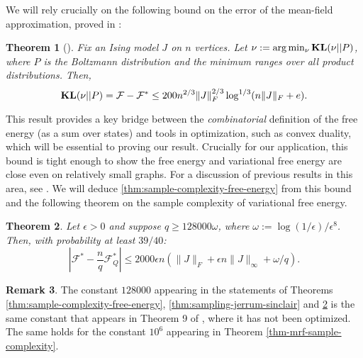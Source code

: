 \documentclass[final, 12pt]{colt2018}
\newcommand{\F}{\mathcal{F}}
\newcommand{\KL}{\mathop{\bf KL\/}}
\newcommand{\vnote}[1]{\textcolor{red}{\small {\textbf{(Vishesh: }#1\textbf{) }}}}
\newtheorem{theorem}{Theorem}[section]
\theoremstyle{definition}
\newtheorem{remark}[theorem]{Remark}
\theoremstyle{plain}
\begin{document}
We will rely crucially on the following bound on the error
of the mean-field approximation, proved in \citep{previous-paper}:
\begin{theorem}[\citet{previous-paper}]\label{thm-main-structural-result} 
Fix an Ising model $J$ on $n$ vertices.
Let $\nu := \arg\min_{\nu} \KL(\nu || P)$, where $P$ is the Boltzmann distribution and the minimum ranges
over all product distributions. %
Then,
$$ \KL(\nu || P)  = \F - \F^{*} \leq 200 n^{2/3} \|J\|_F^{2/3} \log^{1/3}(n \|J\|_F + e).$$
\end{theorem}
This result provides a key bridge between
the \emph{combinatorial} definition of the free energy
(as a sum over states) and tools in optimization, such
as convex duality, which will be essential to proving our result.
Crucially for our application, this bound is tight enough to show the free energy and variational free energy are close even on relatively small graphs. For a discussion of previous
results in this area, see \citep{previous-paper}. We will deduce \cref{thm:sample-complexity-free-energy} from this bound and the following theorem on the sample complexity of variational free energy. 

\begin{theorem}
\label{thm:sample-complexity-variational-free-energy}
Let $\epsilon > 0$ and suppose $q \ge 128000\omega$, where $\omega:=\log(1/\epsilon)/\epsilon^{8}$. 
Then, with probability at least $39/40$:
$$\left|\F^* - \frac{n}{q}\F^*_Q\right| \leq 2000\epsilon n \left(\|J\|_F + \epsilon n \|J\|_{\infty} + \omega/q \right).$$
\end{theorem}

\begin{remark}The constant $128000$ appearing in the statements of Theorems \ref{thm:sample-complexity-free-energy}, \ref{thm:sampling-jerrum-sinclair} and \ref{thm:sample-complexity-variational-free-energy} is the same constant that appears in Theorem 9 of \citep{alon-etal-samplingCSP-conference}, where it has not been optimized. The same holds for the constant $10^6$ appearing in Theorem \ref{thm-mrf-sample-complexity}. 
\end{remark}

\begin{comment}
Similarly, \cref{thm-mrf-sample-complexity} follows from Theorem 1.4 of \citep{previous-paper} along with the following: 

\begin{theorem}
\label{thm:mrf-variational-free-energy}
\vnote{ADD STATEMENT}
\end{theorem}
\end{comment}
\end{document}
